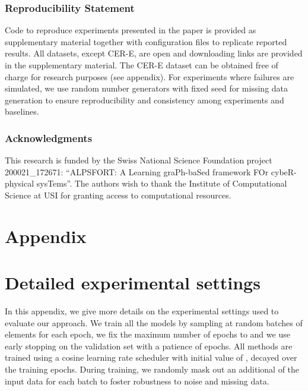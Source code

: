 \documentclass{article} \usepackage{iclr2022_conference,times}
\begin{document}
\clearpage

\subsubsection*{Reproducibility Statement}

Code to reproduce experiments presented in the paper is provided as supplementary material together with configuration files to replicate reported results. All datasets, except CER-E, are open and downloading links are provided in the supplementary material. The CER-E dataset can be obtained free of charge for research purposes (see appendix). For experiments where failures are simulated, we use random number generators with fixed seed for missing data generation to ensure reproducibility and consistency among experiments and baselines.  

\subsubsection*{Acknowledgments}

This research is funded by the Swiss National Science Foundation project 200021\_172671: ``ALPSFORT: A Learning graPh-baSed framework FOr cybeR-physical sysTems''. The authors wish to thank the Institute of Computational Science at USI for granting access to computational resources.







\clearpage
\appendix
\section*{Appendix}

\section{Detailed experimental settings}
\label{a:appendix_exp}

In this appendix, we give more details on the experimental settings used to evaluate our approach. 
We train all the models by sampling at random  batches of  elements for each epoch, we fix the maximum number of epochs to  and we use early stopping on the validation set with a patience of  epochs. All methods are trained using a  cosine learning rate scheduler with initial value of , decayed over the  training epochs. During training, we randomly mask out an additional  of the input data for each batch to foster robustness to noise and missing data.
\end{document}
